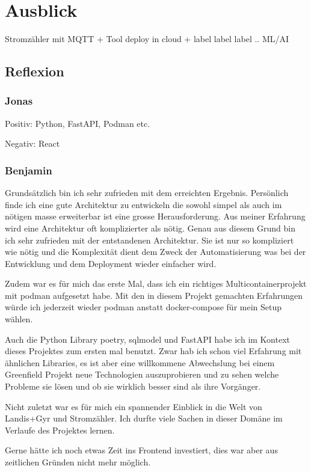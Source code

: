 \chapter{Ausblick}

Stromzähler mit MQTT + Tool deploy in cloud + label label label
..
ML/AI

\section{Reflexion}
\subsection{Jonas}
Positiv: Python, FastAPI, Podman etc.

Negativ:
React

\subsection{Benjamin}

Grundsätzlich bin ich sehr zufrieden mit dem erreichten Ergebnis.
Persönlich finde ich eine gute Architektur zu entwickeln die sowohl simpel
als auch im nötigen masse erweiterbar ist eine grosse Herausforderung.
Aus meiner Erfahrung wird eine Architektur oft komplizierter als nötig.
Genau aus diesem Grund bin ich sehr zufrieden mit der entstandenen Architektur.
Sie ist nur so kompliziert wie nötig und die Komplexität dient dem Zweck
der Automatisierung was bei der Entwicklung und dem Deployment wieder einfacher wird.

Zudem war es für mich das erste Mal, dass ich ein richtiges Multicontainerprojekt
mit podman aufgesetzt habe. Mit den in diesem Projekt gemachten Erfahrungen
würde ich jederzeit wieder podman anstatt docker-compose für mein Setup wählen.

Auch die Python Library poetry, sqlmodel und FastAPI habe ich im Kontext dieses
Projektes zum ersten mal benutzt. Zwar hab ich schon viel Erfahrung mit
ähnlichen Libraries, es ist aber eine willkommene Abwechslung bei einem
Greenfield Projekt neue Technologien auszuprobieren und zu sehen welche Probleme sie lösen
und ob sie wirklich besser sind als ihre Vorgänger.

Nicht zuletzt war es für mich ein spannender Einblick in die Welt von Landis+Gyr
und Stromzähler. Ich durfte viele Sachen in dieser Domäne im Verlaufe des Projektes lernen.

Gerne hätte ich noch etwas Zeit ins Frontend investiert, dies war aber aus zeitlichen Gründen
nicht mehr möglich.

